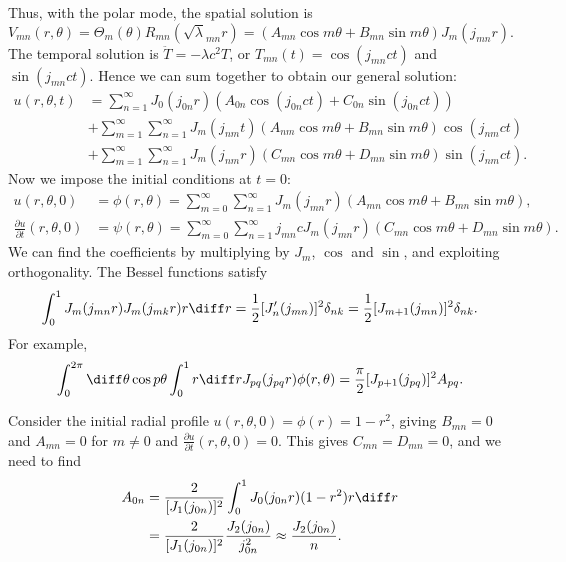 \documentclass[12pt]{article}
\begin{document}
Thus, with the polar mode, the spatial solution is
\[
	V_{mn}(r, \theta) = \Theta_m(\theta) R_{mn}(\sqrt \lambda_{mn} r) = (A_{mn} \cos m \theta + B_{mn} \sin m \theta) J_m(j_{mn} r)
.\]
The temporal solution is $\ddot T = - \lambda c^2 T$, or $T_{mn}(t) = \cos(j_{mn} ct)$ and $\sin (j_{mn} ct)$. Hence we can sum together to obtain our general solution:
\begin{align*}
	u(r, \theta, t) &= \sum_{n = 1}^{\infty}J_0(j_{0n} r) (A_{0n}\cos (j_{0n} ct) + C_{0n} \sin (j_{0n} ct)) \\
			&+ \sum_{m = 1}^{\infty} \sum_{n = 1}^{\infty} J_m(j_{nm}t)(A_{nm} \cos m \theta+ B_{mn} \sin m \theta) \cos (j_{nm} ct) \\
			&+ \sum_{m = 1}^{\infty} \sum_{n = 1}^{\infty} J_m(j_{nm}r)(C_{mn} \cos m \theta + D_{mn} \sin m \theta) \sin (j_{nm} ct).
\end{align*}
Now we impose the initial conditions at $t = 0$:
\begin{align*}
	u(r, \theta, 0) &= \phi(r, \theta) = \sum_{m = 0}^{\infty} \sum_{n = 1}^{\infty} J_m(j_{mn}r) (A_{mn} \cos m \theta + B_{mn} \sin m \theta), \\
	\frac{\partial u}{\partial t}(r, \theta, 0) &= \psi(r, \theta) = \sum_{m = 0}^{\infty} \sum_{n = 1}^{\infty} j_{mn}c J_m(j_{mn} r) (C_{mn} \cos m \theta + D_{mn} \sin m \theta).
\end{align*}
We can find the coefficients by multiplying by $J_m$, $\cos$ and $\sin$, and exploiting orthogonality. The Bessel functions satisfy
\[
	\int_{0}^{1}J_m(j_{mn}r)J_m(j_{mk}r)r \diff r = \frac{1}{2} [J_n'(j_{mn})]^2 \delta_{nk} = \frac{1}{2} [J_{m+1}(j_{mn})]^2\delta_{nk}
.\]
For example,
\[
	\int_{0}^{2\pi}\diff \theta \cos p \theta \int_{0}^{1} r \diff r J_{pq}(j_{pq} r) \phi(r, \theta) = \frac{\pi}{2} [J_{p+1}(j_{pq})]^2 A_{pq}
.\]

\begin{exbox}
	Consider the initial radial profile $u(r, \theta, 0) = \phi(r) = 1 - r^2$, giving $B_{mn} = 0$ and $A_{mn} = 0$ for $m \neq 0$ and $\frac{\partial u}{\partial t} (r, \theta, 0) = 0$. This gives $C_{mn} = D_{mn} = 0$, and we need to find
	\begin{align*}
		A_{0n} &= \frac{2}{[J_1(j_{0n})]^2} \int_{0}^{1}J_0(j_{0n}r)(1 - r^2)r \diff r \\
		       &= \frac{2}{[J_1(j_{0n})]^2} \frac{J_2(j_{0n})}{j_{0n}^2} \approx \frac{J_2(j_{0n})}{n}.
	\end{align*}

\end{exbox}
\end{document}
